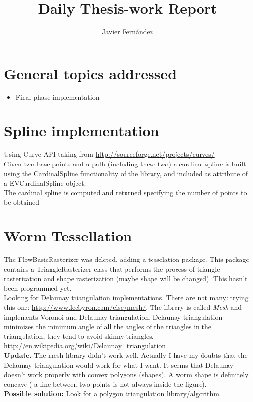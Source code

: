 \documentclass{article}
\title{Daily Thesis-work Report}
\author{Javier Fern\'andez}
\begin{document}
\maketitle

\section{General topics addressed}
\begin{itemize}
\item Final phase implementation
\end{itemize}

\section{Spline implementation}
Using Curve API taking from \url{http://sourceforge.net/projects/curves/}\\
Given two base points and a path (including these two) a cardinal spline
is built using the CardinalSpline functionality of the library, and 
included as attribute of a EVCardinalSpline object.\\
The cardinal spline is computed and returned specifying the number of points 
to be obtained

\section{Worm Tessellation}

The FlowBasicRasterizer was deleted, adding a tesselation package. This package
contains a TriangleRasterizer class that performs the process of triangle
rasterization and shape rasterization (maybe shape will be changed). This 
hasn't been programmed yet.\\

Looking for Delaunay triangulation implementations. There are not many:
trying this one: \url{http://www.leebyron.com/else/mesh/}. The library
is called \emph{Mesh} and implements Voronoi and Delaunay triangulation.
Delaunay triangulation minimizes the minimum angle of all the angles of the 
triangles in the triangulation, they tend to avoid skinny triangles.
\url{http://en.wikipedia.org/wiki/Delaunay_triangulation}\\

\textbf{Update: }The mesh library didn't work well. Actually I have my doubts
that the Delaunay triangulation would work for what I want. It seems that
Delaunay doesn't work properly with convex polygons (shapes). A worm shape
is definitely concave ( a line between two points is not always inside the
figure).\\
\textbf{Possible solution: }Look for a polygon triangulation library/algorithm\\
\end{document}
